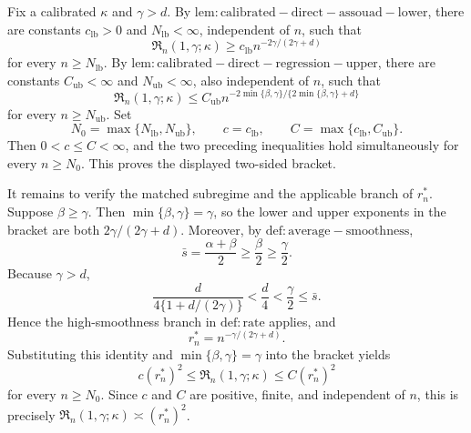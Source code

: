 Fix a calibrated \(\kappa\) and \(\gamma>d\). By \(\mathrm{lem:calibrated-direct-assouad-lower}\), there are constants \(c_{\mathrm{lb}}>0\) and \(N_{\mathrm{lb}}<\infty\), independent of \(n\), such that
\[
\mathfrak R_n(1,\gamma;\kappa)\ge c_{\mathrm{lb}}n^{-2\gamma/(2\gamma+d)}
\]
for every \(n\ge N_{\mathrm{lb}}\). By \(\mathrm{lem:calibrated-direct-regression-upper}\), there are constants \(C_{\mathrm{ub}}<\infty\) and \(N_{\mathrm{ub}}<\infty\), also independent of \(n\), such that
\[
\mathfrak R_n(1,\gamma;\kappa)
\le C_{\mathrm{ub}}n^{-2\min\{\beta,\gamma\}/\{2\min\{\beta,\gamma\}+d\}}
\]
for every \(n\ge N_{\mathrm{ub}}\). Set
\[
N_0=\max\{N_{\mathrm{lb}},N_{\mathrm{ub}}\},\qquad
c=c_{\mathrm{lb}},\qquad
C=\max\{c_{\mathrm{lb}},C_{\mathrm{ub}}\}.
\]
Then \(0<c\le C<\infty\), and the two preceding inequalities hold simultaneously for every \(n\ge N_0\). This proves the displayed two-sided bracket.

It remains to verify the matched subregime and the applicable branch of \(r_n^*\). Suppose \(\beta\ge\gamma\). Then \(\min\{\beta,\gamma\}=\gamma\), so the lower and upper exponents in the bracket are both \(2\gamma/(2\gamma+d)\). Moreover, by \(\mathrm{def:average-smoothness}\),
\[
\bar s=\frac{\alpha+\beta}{2}\ge\frac{\beta}{2}\ge\frac{\gamma}{2}.
\]
Because \(\gamma>d\),
\[
\frac{d}{4\{1+d/(2\gamma)\}}
<\frac d4
<\frac\gamma2
\le\bar s.
\]
Hence the high-smoothness branch in \(\mathrm{def:rate}\) applies, and
\[
r_n^*=n^{-\gamma/(2\gamma+d)}.
\]
Substituting this identity and \(\min\{\beta,\gamma\}=\gamma\) into the bracket yields
\[
c(r_n^*)^2
\le\mathfrak R_n(1,\gamma;\kappa)
\le C(r_n^*)^2
\]
for every \(n\ge N_0\). Since \(c\) and \(C\) are positive, finite, and independent of \(n\), this is precisely \(\mathfrak R_n(1,\gamma;\kappa)\asymp(r_n^*)^2\).